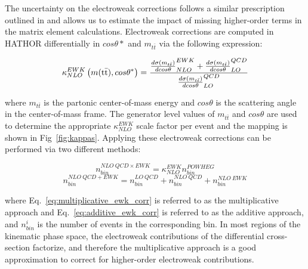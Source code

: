 
The uncertainty on the electroweak corrections follows a similar prescription outlined in \cite{CMS:2020djy} and allows us to estimate the impact of missing higher-order terms in the matrix element calculations. Electroweak corrections are computed in \textsc{HATHOR} differentially in $cos \theta*$ and $m_{t\bar{t}}$ via the following expression:

\begin{equation}
\label{eq:ewk_correction}
    \kappa_{NLO}^{EWK}\left(m(\ttbar), cos \theta^*\right) = \frac{\frac{d\sigma\left(m_{t\bar{t}}\right)}{d cos \theta}_{NLO}^{EWK}%
    + \frac{d\sigma\left(m_{t\bar{t}}\right)}{d cos \theta}_{LO}^{QCD}%
    }{ \frac{d\sigma\left(m_{t\bar{t}}\right)}{d cos \theta}_{LO}^{QCD}%
    }
\end{equation}

where $m_{t\bar{t}}$ is the partonic center-of-mass energy and $cos \theta$ is the scattering angle in the center-of-mass frame. The generator level values of $m_{t\bar{t}}$ and $cos \theta$ are used to determine the appropriate $\kappa_{NLO}^{EWK}$ scale factor per event and the mapping is shown in Fig~\ref{fig:kappas}. Applying these electroweak corrections can be performed via two different methods:

\begin{equation}
\label{eq:multiplicative_ewk_corr}
    n_{bin}^{NLO\ QCD \times EWK} =  \kappa_{NLO}^{EWK} n_{bin}^{POWHEG}
\end{equation}
\begin{equation}
\label{eq:additive_ewk_corr}
    n_{bin}^{NLO\ QCD + EWK} = n_{bin}^{LO\ QCD} + n_{bin}^{NLO\ QCD} + n_{bin}^{NLO\ EWK}
\end{equation}

where Eq.~\ref{eq:multiplicative_ewk_corr} is referred to as the multiplicative approach and Eq.~\ref{eq:additive_ewk_corr} is referred to as the additive approach, and $n_{bin}^i$ is the number of events in the corresponding bin. In most regions of the kinematic phase space, the electroweak contributions of the differential cross-section factorize, and therefore the multiplicative approach is a good approximation to correct for higher-order electroweak contributions.

